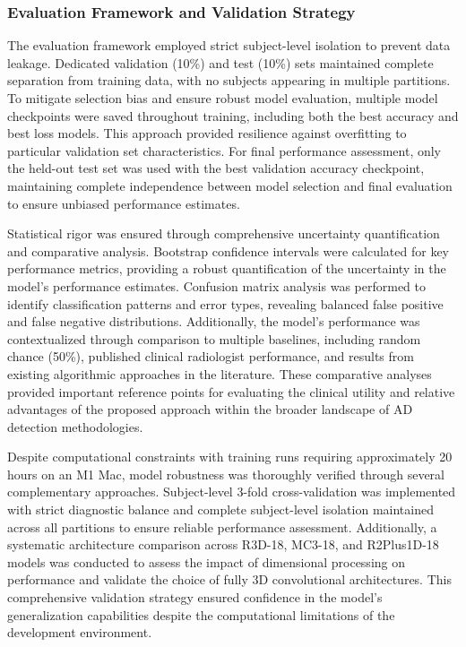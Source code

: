 \documentclass[11pt, a4paper]{article}
\begin{document}
\subsubsection{Evaluation Framework and Validation Strategy}

The evaluation framework employed strict subject-level isolation to prevent data leakage. Dedicated validation (10\%) and test (10\%) sets maintained complete separation from training data, with no subjects appearing in multiple partitions. To mitigate selection bias and ensure robust model evaluation, multiple model checkpoints were saved throughout training, including both the best accuracy and best loss models. This approach provided resilience against overfitting to particular validation set characteristics. For final performance assessment, only the held-out test set was used with the best validation accuracy checkpoint, maintaining complete independence between model selection and final evaluation to ensure unbiased performance estimates.


Statistical rigor was ensured through comprehensive uncertainty quantification and comparative analysis. Bootstrap confidence intervals were calculated for key performance metrics, providing a robust quantification of the uncertainty in the model's performance estimates. Confusion matrix analysis was performed to identify classification patterns and error types, revealing balanced false positive and false negative distributions. Additionally, the model's performance was contextualized through comparison to multiple baselines, including random chance (50\%), published clinical radiologist performance, and results from existing algorithmic approaches in the literature. These comparative analyses provided important reference points for evaluating the clinical utility and relative advantages of the proposed approach within the broader landscape of AD detection methodologies.


Despite computational constraints with training runs requiring approximately 20 hours on an M1 Mac, model robustness was thoroughly verified through several complementary approaches. Subject-level 3-fold cross-validation was implemented with strict diagnostic balance and complete subject-level isolation maintained across all partitions to ensure reliable performance assessment. Additionally, a systematic architecture comparison across R3D-18, MC3-18, and R2Plus1D-18 models was conducted to assess the impact of dimensional processing on performance and validate the choice of fully 3D convolutional architectures. This comprehensive validation strategy ensured confidence in the model's generalization capabilities despite the computational limitations of the development environment.
\end{document}

